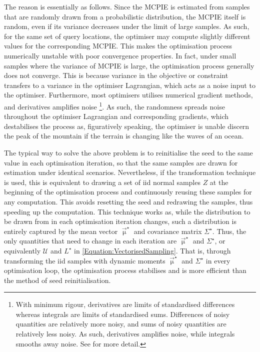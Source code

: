 			The reason is essentially as follows. Since the MCPIE is estimated from samples that are randomly drawn from a probabilistic distribution, the MCPIE itself is random, even if its variance decreases under the limit of large samples. As such, for the same set of query locations, the optimiser may compute slightly different values for the corresponding MCPIE. This makes the optimisation process numerically unstable with poor convergence properties. In fact, under small samples where the variance of MCPIE is large, the optimisation process generally does not converge. This is because variance in the objective or constraint transfers to a variance in the optimiser Lagrangian, which acts as a noise input to the optimiser. Furthermore, most optimisers utilises numerical gradient methods, and derivatives amplifies noise \footnote{With minimum rigour, derivatives are limits of standardised differences whereas integrals are limits of standardised sums. Differences of noisy quantities are relatively more noisy, and sums of noisy quantities are relatively less noisy. As such, derivatives amplifies noise, while integrals smooths away noise. See \cite{Nise:2000:CSE:519085} for more detail.}. As such, the randomness spreads noise throughout the optimiser Lagrangian and corresponding gradients, which destabilises the process as, figuratively speaking, the optimiser is unable discern the peak of the mountain if the terrain is changing like the waves of an ocean. 
			
			The typical way to solve the above problem is to reinitialise the seed to the same value in each optimisation iteration, so that the same samples are drawn for estimation under identical scenarios. Nevertheless, if the transformation technique is used, this is equivalent to drawing a set of iid normal samples $Z$ at the beginning of the optimisation process and continuously reusing these samples for any computation. This avoids resetting the seed and redrawing the samples, thus speeding up the computation. This technique works as, while the distribution to be drawn from in each optimisation iteration changes, such a distribution is entirely captured by the mean vector $\vec{\upmu}^{\star}$ and covariance matrix $\Sigma^{\star}$. Thus, the only quantities that need to change in each iteration are $\vec{\upmu}^{\star}$ and $\Sigma^{\star}$, or equivalently $\mathcal{U}$ and $L^{\star}$ in \eqref{Equation:VectorisedSampling}. That is, through transforming the iid samples with dynamic moments $\vec{\upmu}^{\star}$ and $\Sigma^{\star}$ in every optimisation loop, the optimisation process stabilises and is more efficient than the method of seed reinitialisation.
			
